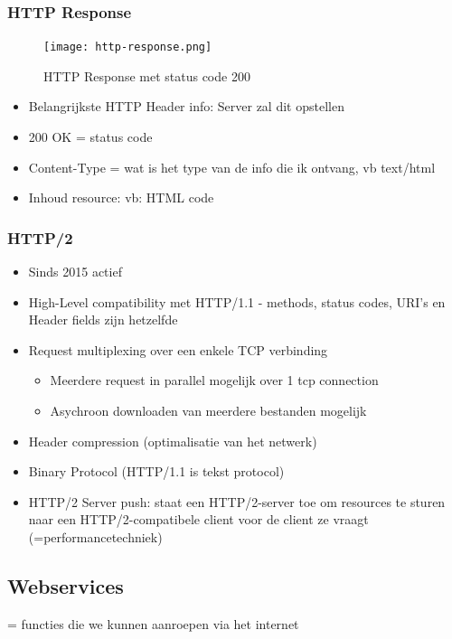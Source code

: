 \documentclass{article}
\begin{document}
\subsubsection{HTTP Response}
\begin{figure}[H]
    \centering
    \texttt{[image: http-response.png]}
    \caption{HTTP Response met status code 200}
\end{figure}

\begin{itemize}
    \item Belangrijkste HTTP Header info: Server zal dit opstellen
    \item 200 OK = status code
    \item Content-Type = wat is het type van de info die ik ontvang, vb text/html
    \item Inhoud resource: vb: HTML code
\end{itemize}

\subsubsection{HTTP/2}

\begin{itemize}
    \item Sinds 2015 actief
    \item High-Level compatibility met HTTP/1.1 - methods, status codes, URI's en Header fields zijn hetzelfde
    \item Request multiplexing over een enkele TCP verbinding
    \begin{itemize}
        \item Meerdere request in parallel mogelijk over 1 tcp connection
        \item Asychroon downloaden van meerdere bestanden mogelijk
    \end{itemize}
    \item Header compression (optimalisatie van het netwerk)
    \item Binary Protocol (HTTP/1.1 is tekst protocol)
    \item HTTP/2 Server push: staat een HTTP/2-server toe om resources te sturen naar een HTTP/2-compatibele client voor de client ze vraagt (=performancetechniek)
\end{itemize}


\subsection{Webservices}
= functies die we kunnen aanroepen via het internet
\end{document}
